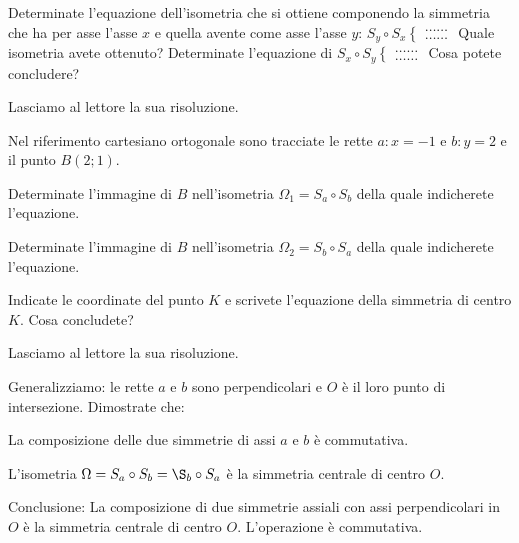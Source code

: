 \begin{exrig}
\begin{esempio}
Determinate l'equazione dell'isometria che si ottiene componendo la simmetria che ha per asse l'asse $x$ e quella avente come asse l'asse $y$: $S_y \circ S_x\begin{cases}\ldots\ldots{}\\\ldots\ldots{}\end{cases}$ Quale isometria avete ottenuto?
Determinate l'equazione di $S_x \circ S_y\begin{cases}\ldots\ldots{}\\\ldots\ldots{}\end{cases}$ Cosa potete concludere?\vspace{7pt}
			
Lasciamo al lettore la sua risoluzione.
\end{esempio}
	
\begin{esempio}
Nel riferimento cartesiano ortogonale sono tracciate le rette $a: x=-1$ e $b: y=2$ e il punto $B(2;1)$.
\begin{enumerate*}
\item Determinate l'immagine di $B$ nell'isometria $\Omega_1 = S_a \circ S_b$ della quale indicherete l'equazione.
\item Determinate l'immagine di $B$ nell'isometria $\Omega_2 = S_b \circ S_a$ della quale indicherete l'equazione.
\item Indicate le coordinate del punto $K$ e scrivete l'equazione della simmetria di centro $K$. Cosa concludete?
\end{enumerate*}
			
Lasciamo al lettore la sua risoluzione.
\end{esempio}
\end{exrig}
			
			
Generalizziamo: le rette $a$ e $b$ sono perpendicolari e $O$ è il loro punto di intersezione. Dimostrate che:
\begin{itemize*}
\item La composizione delle due simmetrie di assi $a$ e $b$ è commutativa.
\item L'isometria $\Omega = S_a\circ S_b = \S_b \circ S_a$ è la simmetria centrale di centro $O$.
\end{itemize*}
			
Conclusione: La composizione di due simmetrie assiali con assi perpendicolari in $O$ è la simmetria centrale di centro $O$. L'operazione è commutativa.
			
